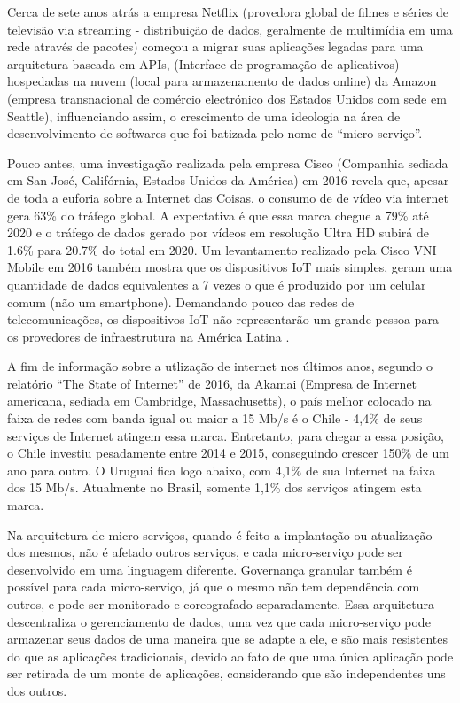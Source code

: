 \documentclass[journal]{IEEEtran}
\begin{document}
Cerca de sete anos atrás a empresa Netflix (provedora global de filmes e séries de televisão via streaming - distribuição de dados, geralmente de multimídia em uma rede através de pacotes) começou a migrar suas aplicações legadas para uma arquitetura baseada em APIs, (Interface de programação de aplicativos) hospedadas na nuvem (local para armazenamento de dados online) da Amazon (empresa transnacional de comércio electrónico dos Estados Unidos com sede em Seattle), influenciando assim, o crescimento de uma ideologia na área de desenvolvimento de softwares que foi batizada pelo nome de “micro-serviço”.

Pouco antes, uma investigação realizada pela empresa Cisco (Companhia sediada em San José, Califórnia, Estados Unidos da América) em 2016 revela que, apesar de toda a euforia sobre a Internet das Coisas, o consumo de de vídeo via internet gera 63\% do tráfego global. A expectativa é que essa marca chegue a 79\% até 2020 e o tráfego de dados gerado por vídeos em resolução Ultra HD subirá de 1.6\% para 20.7\% do total em 2020. Um levantamento realizado pela Cisco VNI Mobile em 2016 também mostra que os dispositivos IoT mais simples, geram uma quantidade de dados equivalentes a 7 vezes o que é produzido por um celular comum (não um smartphone). Demandando pouco das redes de telecomunicações, os dispositivos IoT não representarão um grande pessoa para os provedores de infraestrutura na América Latina \cite{idc2017}. 

A fim de informação sobre a utlização de internet nos últimos anos, segundo o relatório “The State of Internet” de 2016, da Akamai (Empresa de Internet americana, sediada em Cambridge, Massachusetts), o país melhor colocado na faixa de redes com banda igual ou maior a 15 Mb/s é o Chile - 4,4\% de seus serviços de Internet atingem essa marca. Entretanto, para chegar a essa posição, o Chile investiu pesadamente entre 2014 e 2015, conseguindo crescer 150\% de um ano para outro. O Uruguai fica logo abaixo, com 4,1\% de sua Internet na faixa dos 15 Mb/s. Atualmente no Brasil, somente 1,1\% dos serviços atingem esta marca.

Na arquitetura de micro-serviços, quando é feito a implantação ou atualização dos mesmos, não é afetado outros serviços, e cada micro-serviço pode ser desenvolvido em uma linguagem diferente. Governança granular também é possível para cada micro-serviço, já que o mesmo não tem dependência com outros, e pode ser monitorado e coreografado separadamente. Essa arquitetura descentraliza o gerenciamento de dados, uma vez que cada micro-serviço pode armazenar seus dados de uma maneira que se adapte a ele, e são mais resistentes do que as aplicações tradicionais, devido ao fato de que uma única aplicação pode ser retirada de um monte de aplicações, considerando que são independentes uns dos outros.
\end{document}
